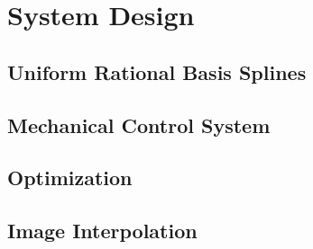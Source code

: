 \chapter{System Design}


\section{Uniform Rational Basis Splines}




\section{Mechanical Control System}

\section{Optimization}








\section{Image Interpolation}